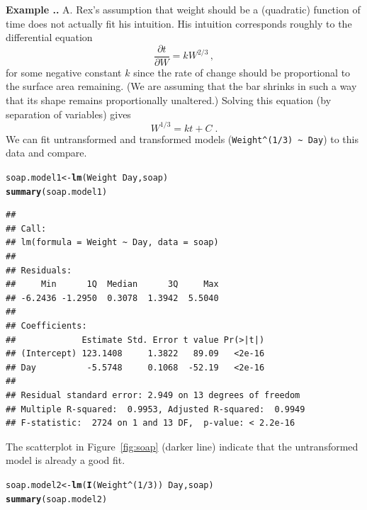 \documentclass[twoside]{book}\usepackage[]{graphicx}\usepackage[]{xcolor}
\makeatletter
\newcommand{\hlnum}[1]{\textcolor[rgb]{0.686,0.059,0.569}{#1}}%
\newcommand{\hlopt}[1]{\textcolor[rgb]{0,0,0}{#1}}%
\newcommand{\hlstd}[1]{\textcolor[rgb]{0.345,0.345,0.345}{#1}}%
\newcommand{\hlkwb}[1]{\textcolor[rgb]{0.69,0.353,0.396}{#1}}%
\newcommand{\hlkwd}[1]{\textcolor[rgb]{0.737,0.353,0.396}{\textbf{#1}}}%
\newenvironment{kframe}{%
 \def\at@end@of@kframe{}%
 \ifinner\ifhmode%
  \def\at@end@of@kframe{\end{minipage}}%
  \begin{minipage}{\columnwidth}%
 \fi\fi%
 \def\FrameCommand##1{\hskip\@totalleftmargin \hskip-\fboxsep
 \colorbox{shadecolor}{##1}\hskip-\fboxsep
     \hskip-\linewidth \hskip-\@totalleftmargin \hskip\columnwidth}%
 \MakeFramed {\advance\hsize-\width
   \@totalleftmargin\z@ \linewidth\hsize
   \@setminipage}}%
 {\par\unskip\endMakeFramed%
 \at@end@of@kframe}
\newenvironment{knitrout}{}{} %
\newcommand{\Partial}[2]{\frac{\partial #1}{\partial #2}}
\def\answer{{\sf A. }}
\newcounter{example}[section]
\newenvironment{example}%
{\refstepcounter{example}%
\textbf{Example \thesection.\arabic{example}. }}%
{}
\makeatother
\begin{document}
\begin{example}
\answer
Rex's assumption that weight should be a (quadratic) function of time 
does not actually fit his intuition.  His intuition corresponds roughly to the 
differential equation
\[
\Partial{t}{W} = k W^{2/3}\,,
\]
for some negative constant $k$ since the rate of change should be 
proportional to the surface area remaining.  
(We are assuming that the bar shrinks in such a way 
that its shape remains proportionally unaltered.)
Solving this equation (by separation of variables) gives
\[
W^{1/3} = k t + C
\;.
\]
We can fit untransformed and transformed models 
(\verb!Weight^(1/3) ~ Day!) to this data and compare.
\begin{knitrout}
\color{fgcolor}\begin{kframe}
\begin{alltt}
\hlstd{soap.model1} \hlkwb{<-} \hlkwd{lm}\hlstd{(Weight}\hlopt{~}\hlstd{Day,soap)}
\hlkwd{summary}\hlstd{(soap.model1)}
\end{alltt}
\begin{verbatim}
## 
## Call:
## lm(formula = Weight ~ Day, data = soap)
## 
## Residuals:
##     Min      1Q  Median      3Q     Max 
## -6.2436 -1.2950  0.3078  1.3942  5.5040 
## 
## Coefficients:
##             Estimate Std. Error t value Pr(>|t|)
## (Intercept) 123.1408     1.3822   89.09   <2e-16
## Day          -5.5748     0.1068  -52.19   <2e-16
## 
## Residual standard error: 2.949 on 13 degrees of freedom
## Multiple R-squared:  0.9953,	Adjusted R-squared:  0.9949 
## F-statistic:  2724 on 1 and 13 DF,  p-value: < 2.2e-16
\end{verbatim}
\end{kframe}
\end{knitrout}
The scatterplot in Figure~\ref{fig:soap} 
(darker line) indicate that the untransformed model is already a good fit.
%
\begin{knitrout}
\color{fgcolor}\begin{kframe}
\begin{alltt}
\hlstd{soap.model2} \hlkwb{<-} \hlkwd{lm}\hlstd{(}\hlkwd{I}\hlstd{(Weight}\hlopt{^}\hlstd{(}\hlnum{1}\hlopt{/}\hlnum{3}\hlstd{))}\hlopt{~}\hlstd{Day,soap)}
\hlkwd{summary}\hlstd{(soap.model2)}
\end{alltt}
\begin{verbatim}

\end{verbatim}
\end{kframe}
\end{knitrout}
\end{example}
\end{document}
